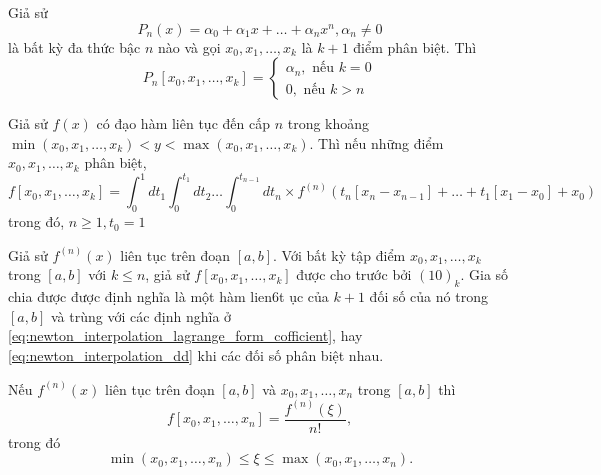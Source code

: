 \begin{coro}
    Giả sử
    \begin{equation}
        P_n(x) = \alpha_0 + \alpha_1x + \dots + \alpha_nx^n, \alpha_n \ne 0
    \end{equation}
    là bất kỳ đa thức bậc $n$ nào và gọi $x_0, x_1, \dots, x_{k}$ là $k+1$ điểm phân biệt. Thì
    \begin{equation}
        P_n[x_0, x_1, \dots, x_{k}] = 
        \begin{cases}
            \alpha_n, \text{ nếu } k = 0\\
            0, \text{ nếu } k > n
        \end{cases}
    \end{equation}
\end{coro}

\begin{theorem}
    Giả sử $f(x)$ có đạo hàm liên tục đến cấp $n$ trong khoảng $\min(x_0, x_1, \dots, x_{k}) < y < \max(x_0, x_1, \dots, x_{k})$. Thì nếu những điểm $x_0, x_1, \dots, x_{k}$ phân biệt, 
    \begin{equation}
        f[x_0, x_1, \dots, x_{k}] = \int_0^1dt_1\int_0^{t_1}dt_2\dots\int_0^{t_{n-1}}dt_n \times 
        f^{(n)}(t_n[x_n-x_{n-1}] + \dots + t_1[x_1 - x_0] + x_0)
    \end{equation}
    trong đó, $n \geq 1, t_0 = 1$
\end{theorem}

\begin{coro}
    Giả sử $f^{(n)}(x)$ liên tục trên đoạn $[a, b]$. Với bất kỳ tập điểm $x_0, x_1, \dots, x_k$ trong $[a, b]$ với $k \leq n$, giả sử $f[x_0, x_1, \dots, x_k]$ được cho trước bởi $(10)_k$. Gia số chia được được định nghĩa là một hàm lien6t ục của $k+1$ đối số của nó trong $[a, b]$ và trùng với các định nghĩa ở \eqref{eq:newton_interpolation_lagrange_form_cofficient}, hay \eqref{eq:newton_interpolation_dd} khi các đối số phân biệt nhau.
\end{coro}

\begin{coro}
    Nếu $f^{(n)}(x)$ liên tục trên đoạn $[a, b]$ và $x_0, x_1, \dots, x_n$ trong $[a, b]$ thì 
    \begin{equation}
        f[x_0, x_1, \dots, x_n] = \frac{f^{(n)}(\xi)}{n!},
    \end{equation}
    trong đó 
    \begin{equation}
        \min(x_0, x_1, \dots, x_n) \leq \xi \leq \max(x_0, x_1, \dots, x_n).
    \end{equation}
\end{coro}

